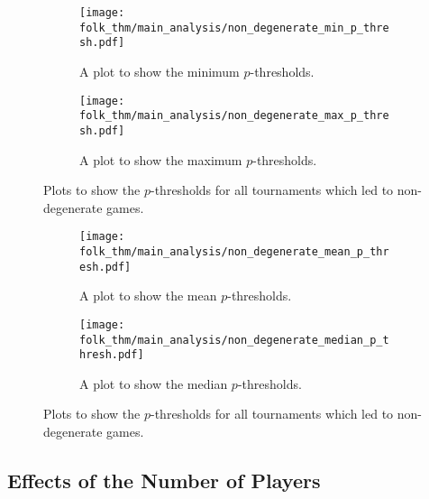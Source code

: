 \begin{figure}
    \begin{subfigure}{.45\textwidth}
        \centering
        \texttt{[image: folk\_thm/main\_analysis/non\_degenerate\_min\_p\_thresh.pdf]}
        \caption{A plot to show the minimum \(p\)-thresholds.}\label{subfig:non_degen_min_p_thresh}
    \end{subfigure}
    \begin{subfigure}{.45\textwidth}
        \centering
        \texttt{[image: folk\_thm/main\_analysis/non\_degenerate\_max\_p\_thresh.pdf]}
        \caption{A plot to show the maximum \(p\)-thresholds.}\label{subfig:non_degen_max_p_thresh}
    \end{subfigure}
    \caption{Plots to show the \(p\)-thresholds for all tournaments which led to non-degenerate games.}\label{fig:non_degen_min_max_p_thresh}
\end{figure}


\begin{figure}
    \begin{subfigure}{.45\textwidth}
        \centering
        \texttt{[image: folk\_thm/main\_analysis/non\_degenerate\_mean\_p\_thresh.pdf]}
        \caption{A plot to show the mean \(p\)-thresholds.}\label{subfig:non_degen_mean_p_thresh}
    \end{subfigure}
    \begin{subfigure}{.45\textwidth}
        \centering
        \texttt{[image: folk\_thm/main\_analysis/non\_degenerate\_median\_p\_thresh.pdf]}
        \caption{A plot to show the median \(p\)-thresholds.}\label{subfig:non_degen_median_p_thresh}
    \end{subfigure}
    \caption{Plots to show the \(p\)-thresholds for all tournaments which led to non-degenerate games.}\label{fig:non_degen_mean_median_p_thresh}
\end{figure}




\subsection{Effects of the Number of Players}\label{subsec:Effects_of_the_number_of_Players}


